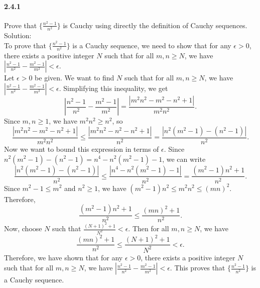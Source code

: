 \documentclass{article}
\begin{document}
\paragraph{2.4.1}
Prove that $\{\frac{n^2-1}{n^2}\}$  is Cauchy using directly the definition of Cauchy sequences.\\
Solution:\\
To prove that $\{\frac{n^2-1}{n^2}\}$ is a Cauchy sequence, we need to show that for any $\epsilon > 0$, there exists a positive integer $N$ such that for all $m, n \geq N$, we have $\left|\frac{n^2-1}{n^2} - \frac{m^2-1}{m^2}\right| < \epsilon$.\\
Let $\epsilon > 0$ be given. We want to find $N$ such that for all $m, n \geq N$, we have $\left|\frac{n^2-1}{n^2} - \frac{m^2-1}{m^2}\right| < \epsilon$. Simplifying this inequality, we get
$$\left|\frac{n^2-1}{n^2} - \frac{m^2-1}{m^2}\right| = \frac{|m^2n^2 - m^2 - n^2 + 1|}{m^2n^2}.$$
Since $m, n \geq 1$, we have $m^2n^2 \geq n^2$, so
$$\frac{|m^2n^2 - m^2 - n^2 + 1|}{m^2n^2} \leq \frac{|m^2n^2 - n^2 - n^2 + 1|}{n^2} = \frac{|n^2(m^2-1) - (n^2-1)|}{n^2}.$$
Now we want to bound this expression in terms of $\epsilon$. Since $n^2(m^2-1) - (n^2-1) = n^4 - n^2(m^2-1) - 1$, we can write
$$\frac{|n^2(m^2-1) - (n^2-1)|}{n^2} \leq \frac{|n^4 - n^2(m^2-1) - 1|}{n^2} = \frac{(m^2-1)n^2 + 1}{n^2}.$$
Since $m^2-1 \leq m^2$ and $n^2 \geq 1$, we have $(m^2-1)n^2 \leq m^2n^2 \leq (mn)^2$. Therefore,
$$\frac{(m^2-1)n^2 + 1}{n^2} \leq \frac{(mn)^2 + 1}{n^2}.$$
Now, choose $N$ such that $\frac{(N+1)^2 + 1}{N^2} < \epsilon$. Then for all $m, n \geq N$, we have
$$\frac{(mn)^2 + 1}{n^2} \leq \frac{(N+1)^2 + 1}{N^2} < \epsilon.$$
Therefore, we have shown that for any $\epsilon > 0$, there exists a positive integer $N$ such that for all $m, n \geq N$, we have $\left|\frac{n^2-1}{n^2} - \frac{m^2-1}{m^2}\right| < \epsilon$. This proves that $\{\frac{n^2-1}{n^2}\}$ is a Cauchy sequence.
\end{document}
